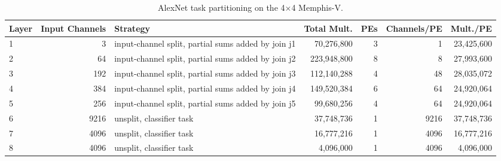 \begin{table}[htbp]
\centering
\caption{AlexNet task partitioning on the 4$\times$4 Memphis-V.}
\label{tab:alexnet_partitioning}
\begin{tabular}{lrlrrrr}
\toprule
\textbf{Layer} & \textbf{Input Channels} & \textbf{Strategy} & \textbf{Total Mult.} & \textbf{PEs} & \textbf{Channels/PE} & \textbf{Mult./PE} \\
\midrule
1 & 3 & input-channel split, partial sums added by join j1 & 70{,}276{,}800 & 3 & 1 & 23{,}425{,}600 \\
2 & 64 & input-channel split, partial sums added by join j2 & 223{,}948{,}800 & 8 & 8 & 27{,}993{,}600 \\
3 & 192 & input-channel split, partial sums added by join j3 & 112{,}140{,}288 & 4 & 48 & 28{,}035{,}072 \\
4 & 384 & input-channel split, partial sums added by join j4 & 149{,}520{,}384 & 6 & 64 & 24{,}920{,}064 \\
5 & 256 & input-channel split, partial sums added by join j5 & 99{,}680{,}256 & 4 & 64 & 24{,}920{,}064 \\
6 & 9216 & unsplit, classifier task & 37{,}748{,}736 & 1 & 9216 & 37{,}748{,}736 \\
7 & 4096 & unsplit, classifier task & 16{,}777{,}216 & 1 & 4096 & 16{,}777{,}216 \\
8 & 4096 & unsplit, classifier task & 4{,}096{,}000 & 1 & 4096 & 4{,}096{,}000 \\
\bottomrule
\end{tabular}
\end{table}
